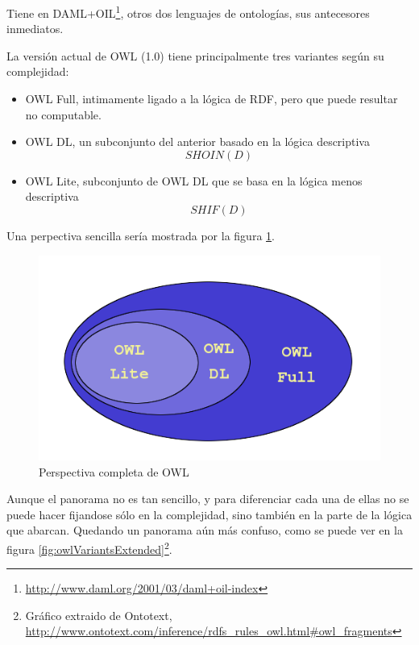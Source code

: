 Tiene en DAML+OIL\footnote{\url{http://www.daml.org/2001/03/daml+oil-index}}, 
otros dos lenguajes de ontologías, sus antecesores inmediatos.

La versión actual de OWL (1.0) tiene principalmente tres variantes según su
complejidad:

\begin{itemize}
  \item OWL Full, intimamente ligado a la lógica de RDF, pero que puede resultar
	no computable.
  \item OWL DL, un subconjunto del anterior basado en la lógica descriptiva 
	\begin{displaymath}
		{SHOIN} (D)
	\end{displaymath}
  \item OWL Lite, subconjunto de OWL DL que se basa en la lógica menos descriptiva
	\begin{displaymath}
 		{SHIF} (D)
	\end{displaymath}
\end{itemize}

Una perpectiva sencilla sería mostrada por la figura \ref{fig:owlVariants}.

\begin{figure}[ht]
	\centering
	\includegraphics[width=12cm]{images/owl-variants.png}
	\caption{Perspectiva completa de OWL}
	\label{fig:owlVariants}
\end{figure}

Aunque el panorama no es tan sencillo, y para diferenciar cada una de ellas no
se puede hacer fijandose sólo en la complejidad, sino también en la parte de la 
lógica que abarcan. Quedando un panorama aún más confuso, como se puede ver en 
la figura \ref{fig:owlVariantsExtended}\footnote{Gráfico extraido de Ontotext, 
\url{http://www.ontotext.com/inference/rdfs_rules_owl.html#owl_fragments}}.

